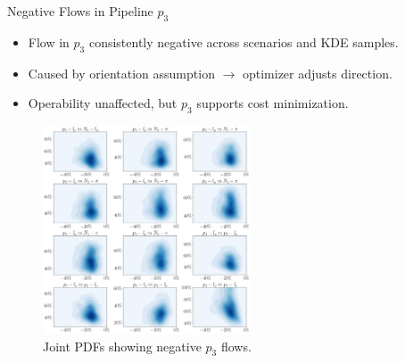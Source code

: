 \documentclass[hyperref={colorlinks,citecolor=blue,linkcolor=blue,urlcolor=blue}]{beamer}
\begin{document}

\begin{frame}{Negative Flows in Pipeline $p_3$}
\footnotesize
    \begin{itemize}
        \item Flow in $p_3$ consistently negative across scenarios and KDE samples.
        \item Caused by orientation assumption $\rightarrow$ optimizer adjusts direction.
        \item Operability unaffected, but $p_3$ supports cost minimization.
    \end{itemize}
    \begin{figure}
        \includegraphics[width=0.55\textwidth]{figures/outputs_outputs_2.png}
        \caption*{Joint PDFs showing negative $p_3$ flows.}
    \end{figure}
\end{frame}
\end{document}
